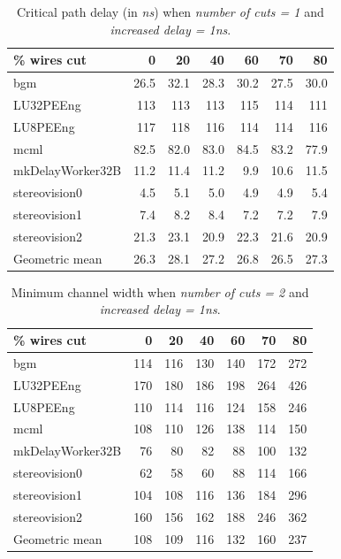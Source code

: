 \documentclass{sig-alternate-2013}
\begin{document}
\begin{table}[!htbp]
\begin{tabular}{|l|r|r|r|r|r|r|}
\hline
\% wires cut & 0 & 20 & 40 & 60 & 70 & 80 \\ \hline \hline
bgm & 26.5 & 32.1 & 28.3 & 30.2 & 27.5 & 30.0 \\ \hline
LU32PEEng & 113 & 113 & 113 & 115 & 114 & 111 \\ \hline
LU8PEEng & 117 & 118 & 116 & 114 & 114 & 116 \\ \hline
mcml & 82.5 & 82.0 & 83.0 & 84.5 & 83.2 & 77.9 \\ \hline
mkDelayWorker32B & 11.2 & 11.4 & 11.2 & 9.9 & 10.6 & 11.5 \\ \hline
stereovision0 & 4.5 & 5.1 & 5.0 & 4.9 & 4.9 & 5.4 \\ \hline
stereovision1 & 7.4 & 8.2 & 8.4 & 7.2 & 7.2 & 7.9 \\ \hline
stereovision2 & 21.3 & 23.1 & 20.9 & 22.3 & 21.6 & 20.9 \\ \hline
Geometric mean & 26.3 & 28.1 & 27.2 & 26.8 & 26.5 & 27.3 \\ \hline
\end{tabular}
\caption{Critical path delay (in \textit{ns}) when \textit{number of cuts = 1} and \textit{increased delay = 1ns}.}
\label{table:1cut_path}
\end{table}

\begin{table}[!htbp]
\begin{tabular}{|l|r|r|r|r|r|r|}
\hline
\% wires cut & 0 & 20 & 40 & 60 & 70 & 80 \\ \hline \hline
bgm & 114 & 116 & 130 & 140 & 172 & 272 \\ \hline
LU32PEEng & 170 & 180 & 186 & 198 & 264 & 426 \\ \hline
LU8PEEng & 110 & 114 & 116 & 124 & 158 & 246 \\ \hline
mcml & 108 & 110 & 126 & 138 & 114 & 150 \\ \hline
mkDelayWorker32B & 76 & 80 & 82 & 88 & 100 & 132 \\ \hline
stereovision0 & 62 & 58 & 60 & 88 & 114 & 166 \\ \hline
stereovision1 & 104 & 108 & 116 & 136 & 184 & 296 \\ \hline
stereovision2 & 160 & 156 & 162 & 188 & 246 & 362 \\ \hline
Geometric mean & 108 & 109 & 116 & 132 & 160 & 237 \\ \hline
\end{tabular}
\caption{Minimum channel width when \textit{number of cuts = 2} and \textit{increased delay = 1ns}.}
\label{table:2cut_minW}
\end{table}
\end{document}
